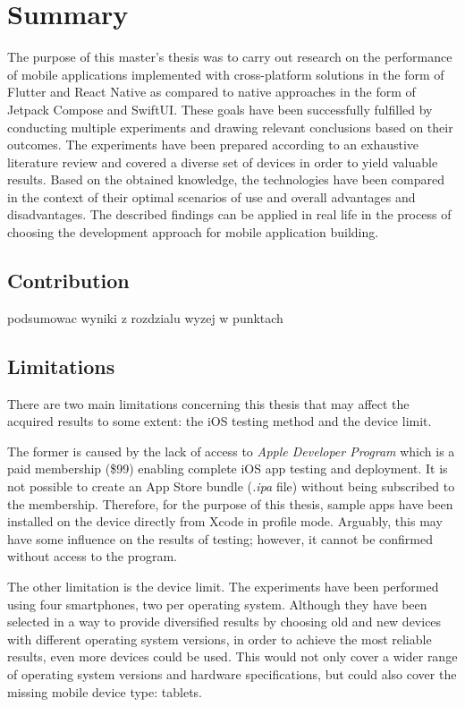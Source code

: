 
\chapter{Summary}

The purpose of this master's thesis was to carry out research on the performance of mobile applications implemented with cross-platform solutions in the form of Flutter and React Native as compared to native approaches in the form of Jetpack Compose and SwiftUI. These goals have been successfully fulfilled by conducting multiple experiments and drawing relevant conclusions based on their outcomes. The experiments have been prepared according to an exhaustive literature review and covered a diverse set of devices in order to yield valuable results. Based on the obtained knowledge, the technologies have been compared in the context of their optimal scenarios of use and overall advantages and disadvantages. The described findings can be applied in real life in the process of choosing the development approach for mobile application building.

\section{Contribution}

podsumowac wyniki z rozdzialu wyzej w punktach

\section{Limitations}

There are two main limitations concerning this thesis that may affect the acquired results to some extent: the iOS testing method and the device limit.

The former is caused by the lack of access to \emph{Apple Developer Program} which is a paid membership (\$99) enabling complete iOS app testing and deployment. It is not possible to create an App Store bundle (\emph{.ipa} file) without being subscribed to the membership. Therefore, for the purpose of this thesis, sample apps have been installed on the device directly from Xcode in profile mode. Arguably, this may have some influence on the results of testing; however, it cannot be confirmed without access to the program.

The other limitation is the device limit. The experiments have been performed using four smartphones, two per operating system. Although they have been selected in a way to provide diversified results by choosing old and new devices with different operating system versions, in order to achieve the most reliable results, even more devices could be used. This would not only cover a wider range of operating system versions and hardware specifications, but could also cover the missing mobile device type: tablets.

